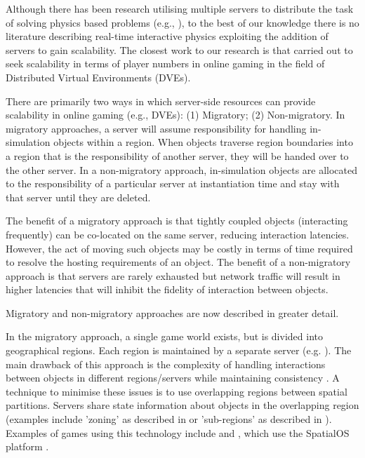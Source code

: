 Although there has been research utilising multiple servers to distribute the task of solving physics based problems (e.g., \cite{mashayekhi2018automatically}), to the best of our knowledge there is no literature describing real-time interactive physics exploiting the addition of servers to gain scalability. The closest work to our research is that carried out to seek scalability in terms of player numbers in online gaming in the field of Distributed Virtual Environments (DVEs). 

There are primarily two ways in which server-side resources can provide scalability in online gaming (e.g., DVEs): (1) Migratory; (2) Non-migratory. In migratory approaches, a server will assume responsibility for handling in-simulation objects within a region. When objects traverse region boundaries into a region that is the responsibility of another server, they will be handed over to the other server. In a non-migratory approach, in-simulation objects are allocated to the responsibility of a particular server at instantiation time and stay with that server until they are deleted.

The benefit of a migratory approach is that tightly coupled objects (interacting frequently) can be co-located on the same server, reducing interaction latencies. However, the act of moving such objects may be costly in terms of time required to resolve the hosting requirements of an object. The benefit of a non-migratory approach is that servers are rarely exhausted but network traffic will result in higher latencies that will inhibit the fidelity of interaction between objects.

Migratory and non-migratory approaches are now described in greater detail.

In the migratory approach, a single game world exists, but is divided into geographical regions. Each region is maintained by a separate server (e.g. \cite{AnOverlappingArchitecture, ScalabilityIssues, LoadBalancingForDistributedVR, ALoadBalancingAlgorithm, SpatialOS}). The main drawback of this approach is the complexity of handling interactions between objects in different regions/servers while maintaining consistency \cite{P2PForMMOs}. A technique to minimise these issues is to use overlapping regions between spatial partitions. Servers share state information about objects in the overlapping region (examples include 'zoning' as described in \cite{AnOverlappingArchitecture} or 'sub-regions' as described in \cite{ScalabilityIssues}). Examples of games using this technology include \cite{Vanishin30:online} and \cite{WorldsAd48:online}, which use the SpatialOS platform \cite{SpatialOS}. %
 
